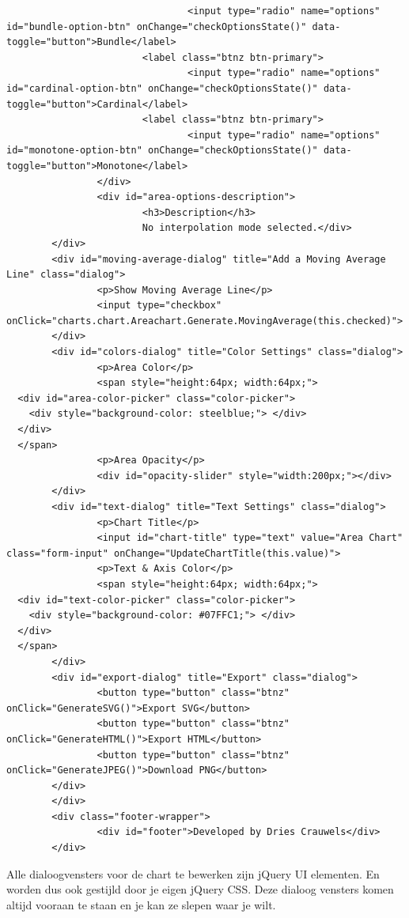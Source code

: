 \begin{lstlisting}
                                <input type="radio" name="options" id="bundle-option-btn" onChange="checkOptionsState()" data-toggle="button">Bundle</label>
                        <label class="btnz btn-primary">
                                <input type="radio" name="options" id="cardinal-option-btn" onChange="checkOptionsState()" data-toggle="button">Cardinal</label>
                        <label class="btnz btn-primary">
                                <input type="radio" name="options" id="monotone-option-btn" onChange="checkOptionsState()" data-toggle="button">Monotone</label>
                </div>
                <div id="area-options-description">
                        <h3>Description</h3>
                        No interpolation mode selected.</div>
        </div>
        <div id="moving-average-dialog" title="Add a Moving Average Line" class="dialog">
                <p>Show Moving Average Line</p>
                <input type="checkbox" onClick="charts.chart.Areachart.Generate.MovingAverage(this.checked)">
        </div>
        <div id="colors-dialog" title="Color Settings" class="dialog">
                <p>Area Color</p>
                <span style="height:64px; width:64px;">
  <div id="area-color-picker" class="color-picker">
    <div style="background-color: steelblue;"> </div>
  </div>
  </span>
                <p>Area Opacity</p>
                <div id="opacity-slider" style="width:200px;"></div>
        </div>
        <div id="text-dialog" title="Text Settings" class="dialog">
                <p>Chart Title</p>
                <input id="chart-title" type="text" value="Area Chart" class="form-input" onChange="UpdateChartTitle(this.value)">
                <p>Text & Axis Color</p>
                <span style="height:64px; width:64px;">
  <div id="text-color-picker" class="color-picker">
    <div style="background-color: #07FFC1;"> </div>
  </div>
  </span> 
        </div>
        <div id="export-dialog" title="Export" class="dialog">
                <button type="button" class="btnz" onClick="GenerateSVG()">Export SVG</button>
                <button type="button" class="btnz" onClick="GenerateHTML()">Export HTML</button>
                <button type="button" class="btnz" onClick="GenerateJPEG()">Download PNG</button>
        </div>
        </div>
        <div class="footer-wrapper">
                <div id="footer">Developed by Dries Crauwels</div>
        </div>
\end{lstlisting}

Alle dialoogvensters voor de chart te bewerken zijn jQuery UI elementen. En worden dus ook gestijld door je eigen jQuery CSS. Deze dialoog vensters komen altijd vooraan te staan en je kan ze slepen waar je wilt. 

